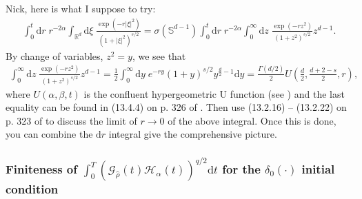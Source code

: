 \documentclass{article}
\numberwithin{equation}{section}
\newcommand{\R}{\mathbb{R}}
\newcommand{\ud}{\ensuremath{\mathrm{d}}}
\begin{document}
\newpage
Nick, here is what I suppose to try:
\begin{align*}
    \int_0^t \ud r \; r^{-2\alpha}  \int_{\R^d} \ud \xi \; \frac{\exp(-r|\xi|^2)}{ (1+|\xi|^2)^{s/2}}
  = \sigma\left(\mathbb{S}^{d-1}\right)\int_0^t \ud r \; r^{-2\alpha} \int_0^\infty \ud z \; \frac{\exp(-r z^2)}{(1+z^2)^{s/2}} z^{d-1}.
\end{align*}
By change of variables, $z^2= y$, we see that
\begin{align*}
  \int_0^\infty \ud z \; \frac{\exp(-r z^2)}{(1+z^2)^{s/2}} z^{d-1}
  = \frac{1}{2} \int_0^\infty \ud y\; e^{-r y} (1+y)^{s/2} y^{\frac{d}{2}-1} \ud y
  = \frac{\Gamma\left(d/2\right)}{2}U\left(\frac{d}{2},\frac{d+2-s}{2},r\right),
\end{align*}
where $U\left(\alpha,\beta,t\right)$ is the confluent hypergeometric U function (see \cite[Chapter 13]{NIST2010}) and
the last equality can be found in (13.4.4) on p. 326 of \cite{NIST2010}. Then use (13.2.16) -- (13.2.22) on p. 323 of
\cite{NIST2010}  to discuss the limit of $r\to 0$ of the above integral. Once this is done, you can combine the $\ud r$
integral give the comprehensive picture.

\newpage

\subsubsection{Finiteness of $\int_0^T \left(\mathcal{G}_{\hat{\rho}}(t)\mathcal{H}_{\alpha}(t)\right)^{q/2} \ud t$ for the $\delta_0(\cdot)$ initial condition}
\end{document}
